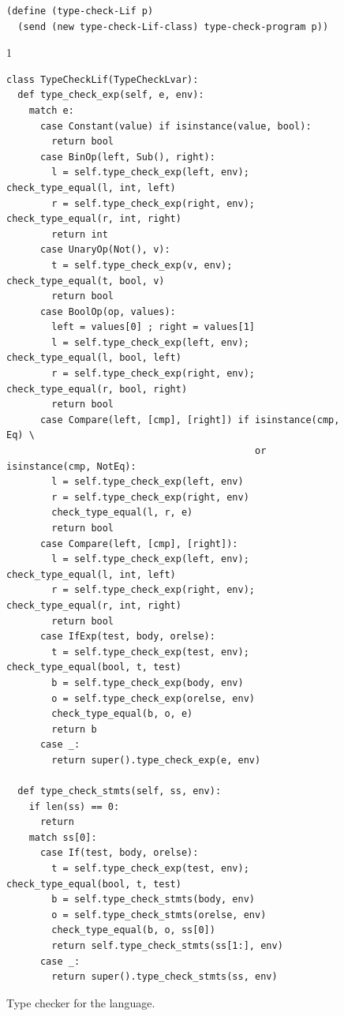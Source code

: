 \documentclass[7x10]{TimesAPriori_MIT}%
\def\pythonEd{1}
\providecommand{\BookEdition}{1}
\let\edition\BookEdition
\newcommand{\pythonColor}[0]{}
\numberwithin{theorem}{chapter}
\numberwithin{definition}{chapter}
\numberwithin{equation}{chapter}
\begin{document}
\begin{figure}[tbp]
\begin{tcolorbox}[colback=white]
{\begin{lstlisting}[basicstyle=\ttfamily\footnotesize]
(define (type-check-Lif p)
  (send (new type-check-Lif-class) type-check-program p))
\end{lstlisting}
\fi}
{\if\edition\pythonEd\pythonColor
\begin{lstlisting}[basicstyle=\ttfamily\footnotesize]
class TypeCheckLif(TypeCheckLvar):
  def type_check_exp(self, e, env):
    match e:
      case Constant(value) if isinstance(value, bool):
        return bool
      case BinOp(left, Sub(), right):
        l = self.type_check_exp(left, env); check_type_equal(l, int, left)
        r = self.type_check_exp(right, env); check_type_equal(r, int, right)
        return int
      case UnaryOp(Not(), v):
        t = self.type_check_exp(v, env); check_type_equal(t, bool, v)
        return bool 
      case BoolOp(op, values):
        left = values[0] ; right = values[1]
        l = self.type_check_exp(left, env); check_type_equal(l, bool, left)
        r = self.type_check_exp(right, env); check_type_equal(r, bool, right)
        return bool
      case Compare(left, [cmp], [right]) if isinstance(cmp, Eq) \
                                            or isinstance(cmp, NotEq):
        l = self.type_check_exp(left, env)
        r = self.type_check_exp(right, env)
        check_type_equal(l, r, e)
        return bool
      case Compare(left, [cmp], [right]):
        l = self.type_check_exp(left, env); check_type_equal(l, int, left)
        r = self.type_check_exp(right, env); check_type_equal(r, int, right)
        return bool
      case IfExp(test, body, orelse):
        t = self.type_check_exp(test, env); check_type_equal(bool, t, test)
        b = self.type_check_exp(body, env)
        o = self.type_check_exp(orelse, env)
        check_type_equal(b, o, e)
        return b
      case _:
        return super().type_check_exp(e, env)

  def type_check_stmts(self, ss, env):
    if len(ss) == 0:
      return
    match ss[0]:
      case If(test, body, orelse):
        t = self.type_check_exp(test, env); check_type_equal(bool, t, test)
        b = self.type_check_stmts(body, env)
        o = self.type_check_stmts(orelse, env)
        check_type_equal(b, o, ss[0])
        return self.type_check_stmts(ss[1:], env)
      case _:
        return super().type_check_stmts(ss, env)
\end{lstlisting}
\fi}
\end{tcolorbox}
\caption{Type checker for the \LangIf{} language.}
\label{fig:type-check-Lif}
\end{figure}
\end{document}
